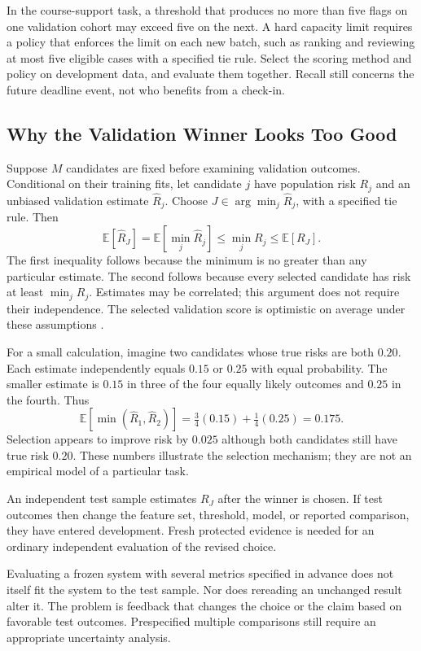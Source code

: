 In the course-support task, a threshold that produces no more than five flags on one validation cohort may exceed five on the next. A hard capacity limit requires a policy that enforces the limit on each new batch, such as ranking and reviewing at most five eligible cases with a specified tie rule. Select the scoring method and policy on development data, and evaluate them together. Recall still concerns the future deadline event, not who benefits from a check-in.

\subsection{Why the Validation Winner Looks Too Good}

Suppose $M$ candidates are fixed before examining validation outcomes. Conditional on their training fits, let candidate $j$ have population risk $R_j$ and an unbiased validation estimate $\hat R_j$. Choose $J\in\arg\min_j\hat R_j$, with a specified tie rule. Then
\[
\mathbb E[\hat R_J]
=\mathbb E[\min_j\hat R_j]
\le\min_j R_j
\le\mathbb E[R_J].
\]
The first inequality follows because the minimum is no greater than any particular estimate. The second follows because every selected candidate has risk at least $\min_j R_j$. Estimates may be correlated; this argument does not require their independence. The selected validation score is optimistic on average under these assumptions \citep{cawley2010}.

For a small calculation, imagine two candidates whose true risks are both $0.20$. Each estimate independently equals $0.15$ or $0.25$ with equal probability. The smaller estimate is $0.15$ in three of the four equally likely outcomes and $0.25$ in the fourth. Thus
\[
\mathbb E[\min(\hat R_1,\hat R_2)]
=\tfrac34(0.15)+\tfrac14(0.25)=0.175.
\]
Selection appears to improve risk by $0.025$ although both candidates still have true risk $0.20$. These numbers illustrate the selection mechanism; they are not an empirical model of a particular task.

An independent test sample estimates $R_J$ after the winner is chosen. If test outcomes then change the feature set, threshold, model, or reported comparison, they have entered development. Fresh protected evidence is needed for an ordinary independent evaluation of the revised choice.

Evaluating a frozen system with several metrics specified in advance does not itself fit the system to the test sample. Nor does rereading an unchanged result alter it. The problem is feedback that changes the choice or the claim based on favorable test outcomes. Prespecified multiple comparisons still require an appropriate uncertainty analysis.

